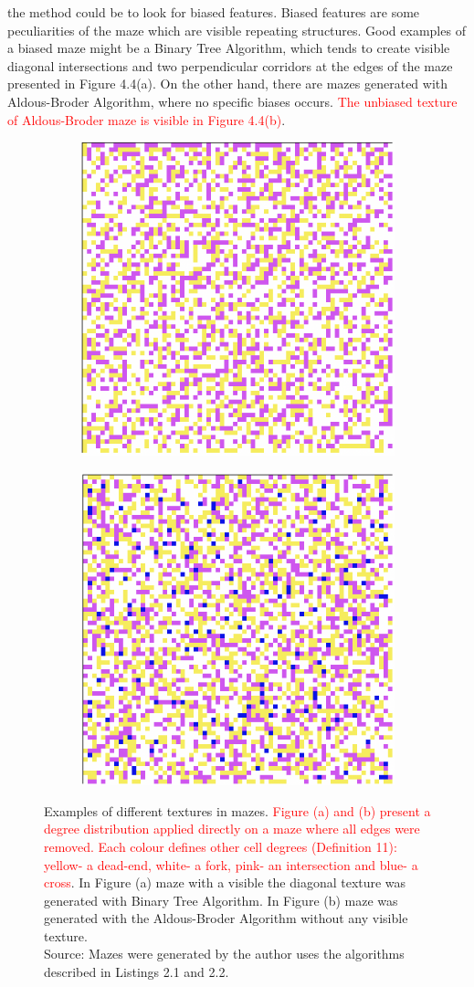 the method could be to look for biased features. Biased features are some peculiarities of the maze which are visible repeating structures. Good examples of a
biased maze might be a Binary Tree Algorithm, which tends to create visible diagonal intersections and two perpendicular corridors
at the edges of the maze presented in Figure 4.4(a). On the other hand, there are mazes generated with Aldous-Broder Algorithm, where no specific biases
occurs. \textcolor{red}{The unbiased texture of Aldous-Broder maze is visible in Figure 4.4(b)}.
\newline
\begin{figure}[!h]
    \centering
    \begin{subfigure}{.5\textwidth}
    \centering
    \includegraphics[width=.5\linewidth]{binarydegree.png}
    \caption{}
    \end{subfigure}%
    \begin{subfigure}{.5\textwidth}
    \centering
    \includegraphics[width=.5\linewidth]{aldousdegree.png}
    \caption{}
    \end{subfigure}
    \caption{Examples of different textures in mazes. \textcolor{red}{Figure (a) and (b) present a degree distribution applied directly on a maze where all edges were removed.
    Each colour defines other cell degrees (Definition 11): yellow- a dead-end, white- a fork, pink- an intersection and blue- a cross}. In Figure (a) maze with a visible
    the diagonal texture was generated with Binary Tree Algorithm. In Figure (b) maze was generated with the Aldous-Broder Algorithm without any visible texture.\\Source: Mazes were generated by
    the author uses the algorithms described in Listings 2.1 and 2.2.}
    \end{figure}
